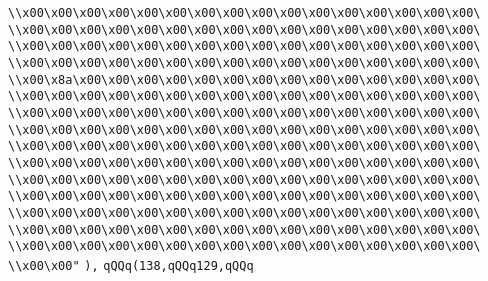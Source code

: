 \verb|\\x00\x00\x00\x00\x00\x00\x00\x00\x00\x00\x00\x00\x00\x00\x00\x00\|\newline
\verb|\\x00\x00\x00\x00\x00\x00\x00\x00\x00\x00\x00\x00\x00\x00\x00\x00\|\newline
\verb|\\x00\x00\x00\x00\x00\x00\x00\x00\x00\x00\x00\x00\x00\x00\x00\x00\|\newline
\verb|\\x00\x00\x00\x00\x00\x00\x00\x00\x00\x00\x00\x00\x00\x00\x00\x00\|\newline
\verb|\\x00\x8a\x00\x00\x00\x00\x00\x00\x00\x00\x00\x00\x00\x00\x00\x00\|\newline
\verb|\\x00\x00\x00\x00\x00\x00\x00\x00\x00\x00\x00\x00\x00\x00\x00\x00\|\newline
\verb|\\x00\x00\x00\x00\x00\x00\x00\x00\x00\x00\x00\x00\x00\x00\x00\x00\|\newline
\verb|\\x00\x00\x00\x00\x00\x00\x00\x00\x00\x00\x00\x00\x00\x00\x00\x00\|\newline
\verb|\\x00\x00\x00\x00\x00\x00\x00\x00\x00\x00\x00\x00\x00\x00\x00\x00\|\newline
\verb|\\x00\x00\x00\x00\x00\x00\x00\x00\x00\x00\x00\x00\x00\x00\x00\x00\|\newline
\verb|\\x00\x00\x00\x00\x00\x00\x00\x00\x00\x00\x00\x00\x00\x00\x00\x00\|\newline
\verb|\\x00\x00\x00\x00\x00\x00\x00\x00\x00\x00\x00\x00\x00\x00\x00\x00\|\newline
\verb|\\x00\x00\x00\x00\x00\x00\x00\x00\x00\x00\x00\x00\x00\x00\x00\x00\|\newline
\verb|\\x00\x00\x00\x00\x00\x00\x00\x00\x00\x00\x00\x00\x00\x00\x00\x00\|\newline
\verb|\\x00\x00\x00\x00\x00\x00\x00\x00\x00\x00\x00\x00\x00\x00\x00\x00\|\newline
\verb|\\x00\x00"|\newline
\verb|),|\newline
\verb|qQQq(138,qQQq129,qQQq|\newline
